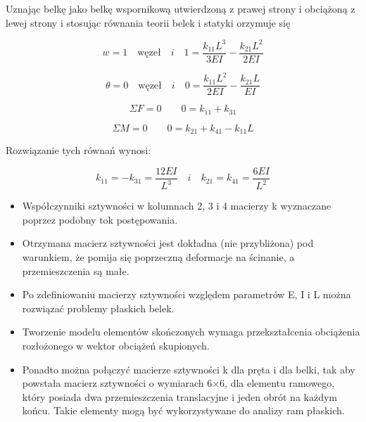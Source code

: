 Uznając belkę jako belkę wspornikową utwierdzoną z prawej strony i obciążoną z lewej strony i stosując równania teorii belek i statyki orzymuje się

\begin{equation}
\label{eq:asdadddddd1}
w=1 \quad \mathrm{węzeł} \quad i \quad  1=\frac{k_{11}L^3}{3EI}-\frac{k_{21}L^2}{2EI}
\end{equation}

\begin{equation}
\label{eq:asdadddddd2}
\theta=0 \quad \mathrm{węzeł} \quad i \quad  0=\frac{k_{11}L^2}{2EI}-\frac{k_{21}L}{EI}
\end{equation}

\begin{equation}
\label{eq:asdadddddd3}
\varSigma F=0 \qquad  0=k_{11}+k_{31}
\end{equation}


\begin{equation}
\label{eq:asdadddddd4}
\varSigma M=0  \qquad  0=k_{21}+k_{41}-k_{11}L
\end{equation}

Rozwiązanie tych równań wynosi:

\begin{equation}
\label{eq:asdaddasdaaaaadddd}
k_{11}=-k_{31}=\frac{12EI}{L^3} \quad i \quad k_{21}=k_{41}=\frac{6EI}{L^2}
\end{equation}

\begin{itemize}
    \item Współczynniki sztywności w kolumnach 2, 3 i 4 macierzy k wyznaczane poprzez podobny tok postępowania.
    \item Otrzymana macierz sztywności jest dokładna (nie przybliżona) pod warunkiem, że
pomija się poprzeczną deformacje na ścinanie, a przemieszczenia są małe.
    \item Po zdefiniowaniu macierzy sztywności względem parametrów E, I i L można rozwiązać problemy płaskich belek.
    \item Tworzenie modelu elementów skończonych wymaga przekształcenia obciążenia
rozłożonego w wektor obciążeń skupionych.
    \item Ponadto można połączyć macierze sztywności k dla pręta i dla belki, tak aby powstała
macierz sztywności o wymiarach 6×6, dla elementu ramowego, który posiada dwa
przemieszczenia translacyjne i jeden obrót na każdym końcu. Takie elementy mogą
być wykorzystywane do analizy ram płaskich.
\end{itemize}

